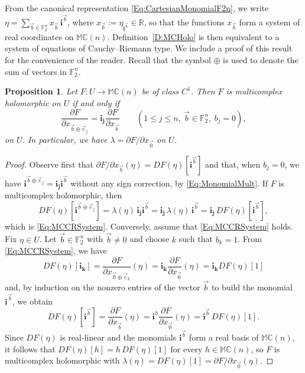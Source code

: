 \documentclass[12pt]{amsart}
\theoremstyle{plain}
\newtheorem{proposition}[theorem]{Proposition}
\theoremstyle{definition}
\numberwithin{equation}{section}
\newcommand{\im}[1]{\mathbf{ i_{#1}}}
\newcommand{\mC}{\mathbb{C}}
\newcommand{\mR}{\mathbb{R}}
\newcommand{\mM}{\mathbb{M}}
\newcommand{\ra}{\rightarrow}
\begin{document}
From the canonical representation \eqref{Eq:CartesianMonomialF2n}, we write $\eta = \sum_{\vec b \in \mathbb F_2^n} x_{\vec b}\, \mathbf i^{\vec b}$, where $x_{\vec b} := \eta_{\mathbf i^{\vec b}} \in \mR$, so that the functions $x_{\vec b}$ form a system of real coordinates on $\mM \mC(n)$. Definition~\ref{D:MCHolo} is then equivalent to a system of equations of Cauchy--Riemann type. We include a proof of this result for the convenience of the reader. %
Recall that the symbol $\oplus$ is used to denote the sum of vectors in $\mathbb{F}_2^n$. 

    \begin{proposition}\label{P:MCHoloSystem}
    Let $F : U \ra \mM \mC(n)$ be of class $C^1$. Then $F$ is multicomplex holomorphic on $U$ if and only if
        \begin{equation}\label{Eq:MCCRSystem}
        \frac{\partial F}{\partial x_{\vec b \oplus \vec e_j}} = \im{j} \frac{\partial F}{\partial x_{\vec b}} \qquad (1 \leq j \leq n , \ \vec b \in \mathbb F_2^n , \ b_j = 0),
        \end{equation}
    on $U$. In particular, we have $\lambda = \partial F / \partial x_{\vec 0}$ on $U$.
    \end{proposition}

    \begin{proof}
    Observe first that $\partial F / \partial x_{\vec b} (\eta ) = DF(\eta) [\mathbf i^{\vec b}]$ and that, when $b_j = 0$, we have $\mathbf i^{\vec b \oplus \vec e_j} = \im{j} \mathbf i^{\vec b}$ without any sign correction, by \eqref{Eq:MonomialMult}. If $F$ is multicomplex holomorphic, then
    \[
    DF(\eta)[\mathbf i^{\vec b \oplus \vec e_j}] = \lambda (\eta)\, \im{j} \mathbf i^{\vec b} = \im{j}\, \lambda (\eta )\, \mathbf i^{\vec b} = \im{j}\, DF (\eta ) [\mathbf i^{\vec b}],
    \]
    which is \eqref{Eq:MCCRSystem}. Conversely, assume that \eqref{Eq:MCCRSystem} holds.  Fix $\eta \in U$. Let $\vec{b} \in \mathbb{F}_2^n$ with $\vec{b} \neq 0$ and choose $k$ such that $b_k = 1$. From \eqref{Eq:MCCRSystem}, we have
    $$
        DF (\eta ) [\im{k}] = \frac{\partial F}{\partial x_{\vec{0} \oplus \vec{e}_k}} (\eta ) = \im{k} \frac{\partial F}{\partial x_{\vec{0}}} (\eta ) = \im{k} DF (\eta ) [1] 
    $$
    and, by induction on the nonzero entries of the vector $\vec{b}$ to build the monomial $\im{}^{\vec{b}}$, we obtain
    \begin{equation}
    DF(\eta) [\mathbf i^{\vec b}] = \frac{\partial F}{\partial x_{\vec{b}}} (\eta ) = \im{}^b \frac{\partial F}{\partial x_{\vec{0}}} (\eta ) = \mathbf i^{\vec b}\, DF(\eta)[1] . \label{Eq:CAuchyRiemannForEVeryI}
    \end{equation}
    Since $DF(\eta)$ is real-linear and the monomials $\mathbf i^{\vec b}$ form a real basis of $\mM \mC(n)$, it follows that $DF (\eta) [h] = h\, DF(\eta)[1]$ for every $h \in \mM \mC(n)$, so $F$ is multicomplex holomorphic with $\lambda (\eta ) = DF (\eta ) [1] = \partial F/\partial x_{\vec 0} (\eta )$.
    \end{proof}
\end{document}
